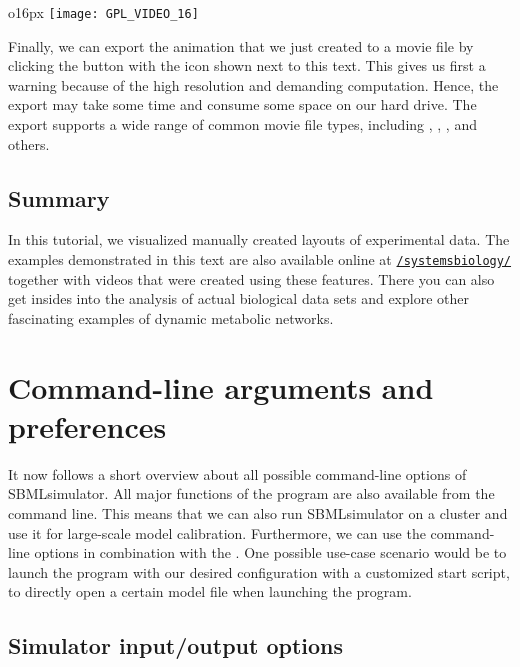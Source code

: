 \begin{wrapfigure}{o}{16px}
\vspace{\wrapfigspace}
\texttt{[image: GPL\_VIDEO\_16]}
\end{wrapfigure}
Finally, we can export the animation that we just created to a movie file by clicking the button with the icon shown next to this text.
This gives us first a warning because of the high resolution and demanding computation.
Hence, the export may take some time and consume some space on our hard drive.
The export supports a wide range of common movie file types, including \AVI, \MOV, \MPG, and others.


\section{Summary}

In this tutorial, we visualized manually created layouts of experimental data.
The examples demonstrated in this text are also available online at {\href{https://www.youtube.com/c/systemsbiology/}{\faYoutube\texttt{/systemsbiology/}}} together with videos that were created using these features.
There you can also get insides into the analysis of actual biological data sets and explore other fascinating examples of dynamic metabolic networks.



\chapter{Command-line arguments and preferences}
\label{chap:CMD}

It now follows a short overview about all possible command-line options of SBMLsimulator.
All major functions of the program are also available from the command line.
This means that we can also run SBMLsimulator on a cluster and use it for large-scale model calibration.
Furthermore, we can use the command-line options in combination with the \GUI.
One possible use-case scenario would be to launch the program with our desired configuration with a customized start script, \eg to directly open a certain model file when launching the program.


\renewcommand{\descriptionlabel}[1]{\textcolor{blue}{\texttt{#1}}}

\section{Simulator input/output options}
